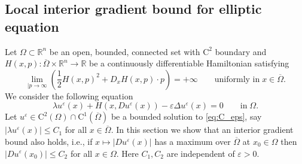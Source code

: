 \documentclass[11pt,reqno]{amsart}
\numberwithin{figure}{section}
\theoremstyle{plain}
\theoremstyle{remark}
\numberwithin{equation}{section}
\newcommand{\R}{\mathbb{R}}
\newcommand{\rmC}{\mathrm{C}}
\begin{document}
\begin{appendices}
\subsection{Local interior gradient bound for elliptic equation}
Let $\Omega\subset \R^n$ be an open, bounded, connected set with $\rmC^2$ boundary and $H(x,p):\overline{\Omega}\times \R^n\rightarrow \mathbb{R}$ be a continuously differentiable Hamiltonian satisfying
\begin{equation}\label{eq:grow}
\lim_{|p\rightarrow \infty} \left(\frac{1}{2}H(x,p)^2 + D_xH(x,p)\cdot p\right) = +\infty \qquad\text{uniformly in}\;x\in \overline{\Omega}. \tag{H1}
\end{equation}
We consider the following equation
\begin{equation}\label{eq:C_eps}
    \lambda u^\varepsilon(x) + H(x,Du^\varepsilon(x)) - \varepsilon \Delta u^\varepsilon(x) = 0 \qquad\text{in}\;\Omega.
\end{equation}
Let $u^\varepsilon\in \rmC^2(\Omega)\cap \mathrm{C}^1(\overline{\Omega})$ be a bounded solution to \eqref{eq:C_eps}, say $|\lambda u^\varepsilon(x)| \leq C_1$ for all $x\in \overline{\Omega}$. In this section we show that an interior gradient bound also holds, i.e., if $x\mapsto|Du^\varepsilon(x)|$ has a maximum over $\overline{\Omega}$ at $x_0\in \Omega$ then $|Du^\varepsilon(x_0)| \leq C_2$ for all $x\in \Omega$. Here $C_1,C_2$ are independent of $\varepsilon>0$.\\



\end{appendices}
\end{document}
